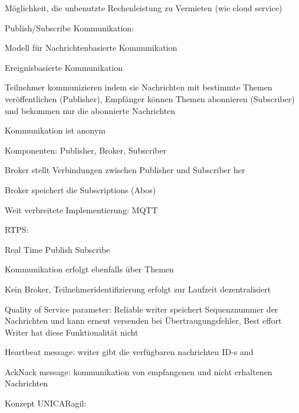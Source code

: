 \begin{notes}
\begin{notes}
\begin{notes}
                \item Möglichkeit, die unbenutzte Rechenleistung zu Vermieten (wie cloud service)
            \end{notes}
        \item Publish/Subscribe Kommunikation:
            \begin{notes}
                \item Modell für Nachrichtenbasierte Kommunikation \cite{MadeWirawan2018}
                \item Ereignisbasierte Kommunikation
                \item Teilnehmer kommunizieren indem sie Nachrichten mit bestimmte Themen veröffentlichen (Publisher), Empfänger können Themen abonnieren (Subscriber) und bekommen nur die abonnierte Nachrichten
                \item Kommunikation ist anonym
                \item Komponenten: Publisher, Broker, Subscriber
                \item Broker stellt Verbindungen zwischen Publisher und Subscriber her
                \item Broker speichert die Subscriptions (Abos)
                \item Weit verbreitete Implementierung: MQTT
                \item RTPS:
                \begin{notes}
                    \item Real Time Publish Subscribe
                    \item Kommunikation erfolgt ebenfalls über Themen
                    \item Kein Broker, Teilnehmeridentifizierung erfolgt zur Laufzeit dezentralisiert
                    \item Quality of Service parameter: Reliable writer speichert Sequenznummer der Nachrichten und kann erneut versenden bei Übertraugungsfehler, Best effort Writer hat diese Funktionalität nicht
                    \item Heartbeat message: writer gibt die verfügbaren nachrichten ID-s and
                    \item AckNack message: kommunikation von empfangenen und nicht erhaltenen Nachrichten
                \end{notes}
            \end{notes}
    \end{notes}
    \item Konzept UNICARagil:

\end{notes}
